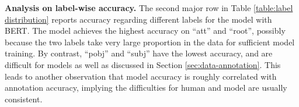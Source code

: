 \textbf{Analysis on label-wise accuracy.}
%
The second major row in Table \ref{table:label distribution} reports accuracy regarding different labels for the model with BERT. 
The model achieves the highest accuracy on ``att'' and ``root'', possibly because the two labels take very large proportion in the data for sufficient model training. 
By contrast, ``pobj'' and ``subj'' have the lowest accuracy, and are difficult for models as well as discussed in Section \ref{sec:data-annotation}. 
This leads to 
another observation that model accuracy is roughly correlated with annotation accuracy, implying the difficulties for human and model are usually consistent. 







